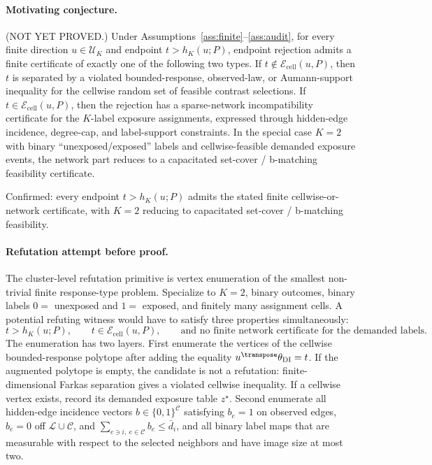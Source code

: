 \begin{theorem}\label{thm:certificate}
\paragraph{Motivating conjecture.}
(NOT YET PROVED.)  Under Assumptions~\ref{ass:finite}--\ref{ass:audit}, for every finite direction \(u\in\mathcal U_K\) and endpoint \(t>h_K(u;P)\), endpoint rejection admits a finite certificate of exactly one of the following two types.  If \(t\notin\mathcal E_{\mathrm{cell}}(u,P)\), then \(t\) is separated by a violated bounded-response, observed-law, or Aumann-support inequality for the cellwise random set of feasible contrast selections.  If \(t\in\mathcal E_{\mathrm{cell}}(u,P)\), then the rejection has a sparse-network incompatibility certificate for the \(K\)-label exposure assignments, expressed through hidden-edge incidence, degree-cap, and label-support constraints.  In the special case \(K=2\) with binary ``unexposed/exposed'' labels and cellwise-feasible demanded exposure events, the network part reduces to a capacitated set-cover / b-matching feasibility certificate.

Confirmed: every endpoint \(t>h_K(u;P)\) admits the stated finite cellwise-or-network certificate, with \(K=2\) reducing to capacitated set-cover / b-matching feasibility.
\end{theorem}

\paragraph{Refutation attempt before proof.}
The cluster-level refutation primitive is vertex enumeration of the smallest non-trivial finite response-type problem.  Specialize to \(K=2\), binary outcomes, binary labels \(0=\) unexposed and \(1=\) exposed, and finitely many assignment cells.  A potential refuting witness would have to satisfy three properties simultaneously:
\[
t>h_K(u;P),\qquad t\in\mathcal E_{\mathrm{cell}}(u,P),\qquad
\text{and no finite network certificate for the demanded labels.}
\]
The enumeration has two layers.  First enumerate the vertices of the cellwise bounded-response polytope after adding the equality \(u^\transpose\theta_{\mathrm{DI}}=t\).  If the augmented polytope is empty, the candidate is not a refutation: finite-dimensional Farkas separation gives a violated cellwise inequality.  If a cellwise vertex exists, record its demanded exposure table \(z^\star\).  Second enumerate all hidden-edge incidence vectors \(b\in\{0,1\}^{\mathcal C}\) satisfying \(b_e=1\) on observed edges, \(b_e=0\) off \(\mathcal L\cup\mathcal C\), and \(\sum_{e\ni i,\ e\in\mathcal C}b_e\le\bar d_i\), and all binary label maps that are measurable with respect to the selected neighbors and have image size at most two.

